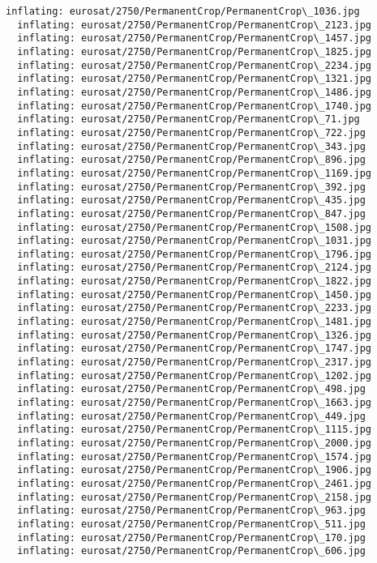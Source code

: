 \documentclass[11pt]{article}
\begin{document}
\begin{Verbatim}[commandchars=\\\{\}]
  inflating: eurosat/2750/PermanentCrop/PermanentCrop\_1036.jpg
  inflating: eurosat/2750/PermanentCrop/PermanentCrop\_2123.jpg
  inflating: eurosat/2750/PermanentCrop/PermanentCrop\_1457.jpg
  inflating: eurosat/2750/PermanentCrop/PermanentCrop\_1825.jpg
  inflating: eurosat/2750/PermanentCrop/PermanentCrop\_2234.jpg
  inflating: eurosat/2750/PermanentCrop/PermanentCrop\_1321.jpg
  inflating: eurosat/2750/PermanentCrop/PermanentCrop\_1486.jpg
  inflating: eurosat/2750/PermanentCrop/PermanentCrop\_1740.jpg
  inflating: eurosat/2750/PermanentCrop/PermanentCrop\_71.jpg
  inflating: eurosat/2750/PermanentCrop/PermanentCrop\_722.jpg
  inflating: eurosat/2750/PermanentCrop/PermanentCrop\_343.jpg
  inflating: eurosat/2750/PermanentCrop/PermanentCrop\_896.jpg
  inflating: eurosat/2750/PermanentCrop/PermanentCrop\_1169.jpg
  inflating: eurosat/2750/PermanentCrop/PermanentCrop\_392.jpg
  inflating: eurosat/2750/PermanentCrop/PermanentCrop\_435.jpg
  inflating: eurosat/2750/PermanentCrop/PermanentCrop\_847.jpg
  inflating: eurosat/2750/PermanentCrop/PermanentCrop\_1508.jpg
  inflating: eurosat/2750/PermanentCrop/PermanentCrop\_1031.jpg
  inflating: eurosat/2750/PermanentCrop/PermanentCrop\_1796.jpg
  inflating: eurosat/2750/PermanentCrop/PermanentCrop\_2124.jpg
  inflating: eurosat/2750/PermanentCrop/PermanentCrop\_1822.jpg
  inflating: eurosat/2750/PermanentCrop/PermanentCrop\_1450.jpg
  inflating: eurosat/2750/PermanentCrop/PermanentCrop\_2233.jpg
  inflating: eurosat/2750/PermanentCrop/PermanentCrop\_1481.jpg
  inflating: eurosat/2750/PermanentCrop/PermanentCrop\_1326.jpg
  inflating: eurosat/2750/PermanentCrop/PermanentCrop\_1747.jpg
  inflating: eurosat/2750/PermanentCrop/PermanentCrop\_2317.jpg
  inflating: eurosat/2750/PermanentCrop/PermanentCrop\_1202.jpg
  inflating: eurosat/2750/PermanentCrop/PermanentCrop\_498.jpg
  inflating: eurosat/2750/PermanentCrop/PermanentCrop\_1663.jpg
  inflating: eurosat/2750/PermanentCrop/PermanentCrop\_449.jpg
  inflating: eurosat/2750/PermanentCrop/PermanentCrop\_1115.jpg
  inflating: eurosat/2750/PermanentCrop/PermanentCrop\_2000.jpg
  inflating: eurosat/2750/PermanentCrop/PermanentCrop\_1574.jpg
  inflating: eurosat/2750/PermanentCrop/PermanentCrop\_1906.jpg
  inflating: eurosat/2750/PermanentCrop/PermanentCrop\_2461.jpg
  inflating: eurosat/2750/PermanentCrop/PermanentCrop\_2158.jpg
  inflating: eurosat/2750/PermanentCrop/PermanentCrop\_963.jpg
  inflating: eurosat/2750/PermanentCrop/PermanentCrop\_511.jpg
  inflating: eurosat/2750/PermanentCrop/PermanentCrop\_170.jpg
  inflating: eurosat/2750/PermanentCrop/PermanentCrop\_606.jpg

\end{Verbatim}
\end{document}
